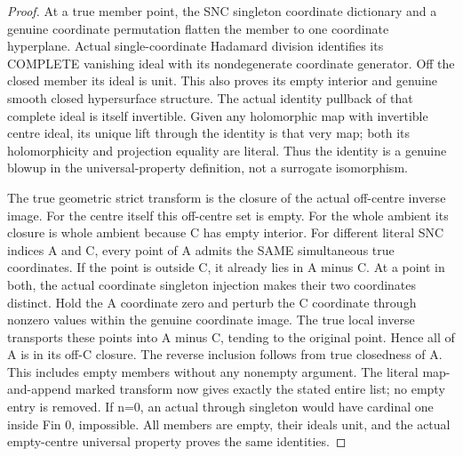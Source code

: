 \begin{proof}
At a true member point, the SNC singleton coordinate dictionary and a genuine
coordinate permutation flatten the member to one coordinate hyperplane.
Actual single-coordinate Hadamard division identifies its COMPLETE vanishing
ideal with its nondegenerate coordinate generator. Off the closed member its
ideal is unit. This also proves its empty interior and genuine smooth closed
hypersurface structure. The actual identity pullback of that complete ideal
is itself invertible. Given any holomorphic map with invertible centre ideal,
its unique lift through the identity is that very map; both its holomorphicity
and projection equality are literal. Thus the identity is a genuine blowup
in the universal-property definition, not a surrogate isomorphism.

The true geometric strict transform is the closure of the actual off-centre
inverse image. For the centre itself this off-centre set is empty. For the
whole ambient its closure is whole ambient because C has empty interior.
For different literal SNC indices A and C, every point of A admits the SAME
simultaneous true coordinates. If the point is outside C, it already lies in
A minus C. At a point in both, the actual coordinate singleton injection
makes their two coordinates distinct. Hold the A coordinate zero and perturb
the C coordinate through nonzero values within the genuine coordinate image.
The true local inverse transports these points into A minus C, tending to the
original point. Hence all of A is in its off-C closure. The reverse inclusion
follows from true closedness of A. This includes empty members without any
nonempty argument. The literal map-and-append marked transform now gives
exactly the stated entire list; no empty entry is removed. If n=0, an actual
through singleton would have cardinal one inside Fin 0, impossible. All
members are empty, their ideals unit, and the actual empty-centre universal
property proves the same identities.
\end{proof}

